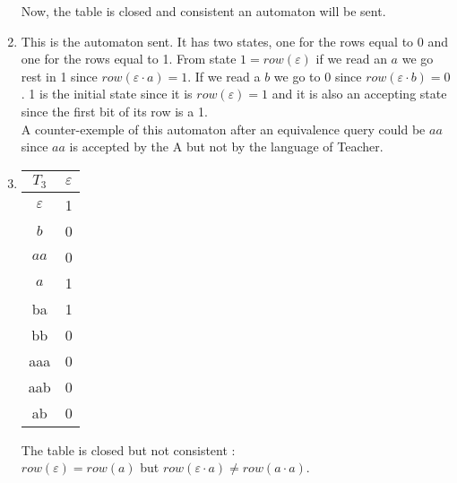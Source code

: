 \begin{enumerate}
\begin{center}
\begin{minipage}{0.5\textwidth}
            Now, the table is closed and consistent an automaton will be sent.
          \end{minipage}
        \end{center}
  \item \quad
        \begin{center}
          
          \quad
          \begin{minipage}{0.5\textwidth}
            This is the automaton sent. It has two states, one for the rows equal to 0 and one for
            the rows equal to 1. From state $1 = row(\varepsilon)$ if we read an $a$ we go rest in 1 since $row(\varepsilon \cdot a) = 1$. If we read a $b$ we go to 0 since $row(\varepsilon \cdot b) = 0$. 1 is the initial state since it is $row(\varepsilon) = 1$ and it is also an accepting state since the first bit of its row is a 1.\\
            A counter-exemple of this automaton after an equivalence query could be $aa$ since $aa$ is accepted by the A but not by the language of Teacher.
          \end{minipage}
        \end{center}
  \item  \quad
        \begin{center}
          \begin{tabular}{c || c }
            $T_3$         & $\varepsilon$ \\ [0.5ex]
            \hline\hline
            $\varepsilon$ & 1             \\
            $b$           & 0             \\
            $aa$          & 0             \\
            $a$           & 1             \\
            \hline \hline
            ba            & 1             \\
            bb            & 0             \\
            aaa           & 0             \\
            aab           & 0             \\
            ab            & 0             \\
          \end{tabular}
          \quad
          \begin{minipage}{0.5\textwidth}
            The table is closed but not consistent :\\
            $row(\varepsilon) = row(a)$ but $row(\varepsilon \cdot a) \neq row(a \cdot a)$.\\

\end{minipage}
\end{center}
\end{enumerate}
